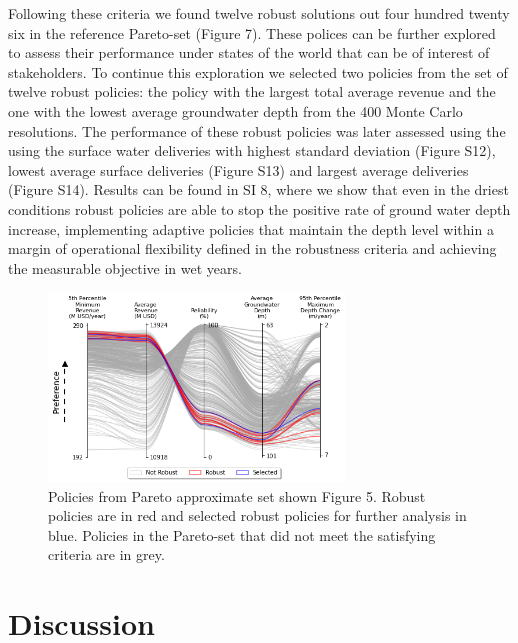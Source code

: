 \documentclass[a4paper,fleqn]{cas-sc}
\begin{document}
Following these criteria we found twelve robust solutions out four hundred twenty six in the reference Pareto-set (Figure 7). These polices can be further explored to assess their performance under states of the world that can be of interest of stakeholders. To continue this exploration we selected two policies from the set of twelve robust policies: the policy with the largest total average revenue and the one with the lowest average groundwater depth from the 400 Monte Carlo resolutions. The performance of these robust policies was later assessed using the using the surface water deliveries with highest standard deviation (Figure S12), lowest average surface deliveries (Figure S13) and largest average deliveries (Figure S14). Results can be found in SI 8, where we show that even in the driest conditions robust policies are able to stop the positive rate of ground water depth increase, implementing adaptive policies that maintain the depth level within a margin of operational flexibility defined in the robustness criteria and achieving the measurable objective in wet years. 

\begin{figure}[H]
    \centering
    \includegraphics[width=0.7\textwidth]{robust_policies_parallel_axis.png}
    \caption{Policies from Pareto approximate set shown Figure 5. Robust policies are in red and selected robust policies for further analysis in blue. Policies in the Pareto-set that did not meet the satisfying criteria are in grey.} \label{fig:parallel_robustness}
\end{figure}

\section{Discussion}
\end{document}
